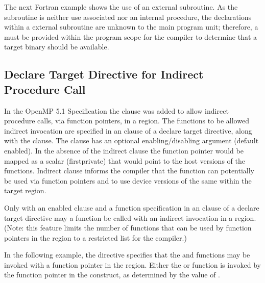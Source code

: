 
\pagebreak
The next Fortran example shows the use of an external subroutine. As the subroutine
is neither use associated nor an internal procedure, the 
declarations within a external subroutine are unknown to the main program unit; 
therefore, a  must be provided within the program
scope for the compiler to determine that a target binary should be available.


\subsection{Declare Target Directive for Indirect Procedure Call}
\label{subsec:indirect}


In the OpenMP 5.1 Specification the  clause was added to allow
indirect procedure calls, via function pointers, in a  region.
The functions to be allowed indirect invocation are specified in an  
clause of a declare target directive, along with the  clause.
The clause has an optional enabling/disabling argument (default enabled). In the 
absence of the indirect clause the function pointer would be mapped as a scalar 
(firstprivate) that would point to the host versions of the functions. 
Indirect clause informs the compiler that the function can potentially be 
used via function pointers and to use device versions of the same within 
the target region.

Only with an enabled  clause and a function specification in an  clause
of a declare target directive may a function be called with an indirect invocation in a  region.
(Note: this feature limits the number of functions that can be used by function 
pointers in the  region to a restricted list for the compiler.)

In the following example, the   
 directive specifies that the  and  functions may 
be invoked with a function pointer in the  region.
Either the  or  function is invoked by the  function 
pointer in the  construct, as determined by the value of .


